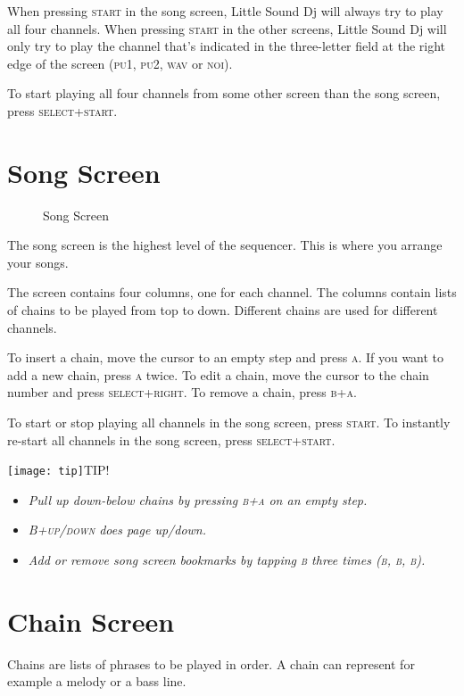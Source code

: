 When pressing \textsc{start} in the song screen, Little Sound Dj will always try to play all four
channels. When pressing \textsc{start} in the other screens, Little Sound Dj will only try to play the
channel that's indicated in the three-letter field at the right edge of the screen (\textsc{pu1}, \textsc{pu2}, \textsc{wav} or \textsc{noi}).

To start playing all four channels from some other screen than the song screen,
press \textsc{select+start}.

\section{Song Screen}

\begin{figure}[hbtp]
\centering
{}
\caption{Song Screen}
\end{figure}

The song screen
is the highest level of the sequencer. This is where you arrange your songs.

The screen contains four columns, one for each channel. The columns contain lists of chains to be played from top to down. Different chains are used for different channels.

To insert a chain, move the cursor to an empty step and press \textsc{a}. If you want to add a new
chain, press \textsc{a} twice. To edit a chain, move the cursor to the chain number and press
\textsc{select+right}. To remove a chain, press \textsc{b+a}.

To start or stop playing all channels in the song screen, press \textsc{start}. To instantly re-start all channels in the song screen, press \textsc{select+start}.

\texttt{[image: tip]}TIP!
\begin{itemize}
\item \textit{Pull up down-below chains by pressing \textsc{b+a} on an empty step.}
\item \textit{\textsc{B+up/down} does page up/down.}
\item \textit{Add or remove song screen bookmarks by tapping \textsc{b} three times \textsc{(b, b, b)}.}
\end{itemize}

\section{Chain Screen}
Chains are lists of phrases to be played in order. A chain can represent for example a melody or a bass line.


